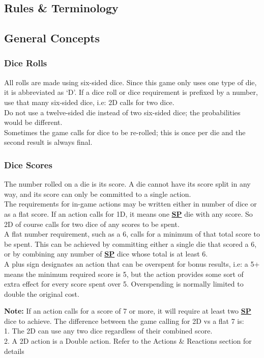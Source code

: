 \documentclass[12pt]{article}
\newcommand{\refto}[1]{\hyperlink{#1}{\textbf{#1}}}
\begin{document}
\begin{multicols*}{2}

\setlength{\parindent}{0pt}
\section{Rules \& Terminology}
\subsection{General Concepts}
\subsubsection*{Dice Rolls}
All rolls are made using six-sided dice. Since this game only uses one type of die, it is abbreviated as ‘D’. If a dice roll or dice requirement is prefixed by a number, use that many six-sided dice, i.e: 2D calls for two dice.\\
Do not use a twelve-sided die instead of two six-sided dice; the probabilities would be different.\\
Sometimes the game calls for dice to be re-rolled; this is once per die and the second result is always final.

\subsubsection*{Dice Scores}
The number rolled on a die is its score. A die cannot have its score split in any way, and its score can only be committed to a single action.\\
The requirements for in-game actions may be written either in number of dice or as a flat score. If an action calls for 1D, it means one \refto{SP} die with any score. So 2D of course calls for two dice of any scores to be spent.\\
A flat number requirement, such as a 6, calls for a minimum of that total score to be spent. This can be achieved by committing either a single die that scored a 6, or by combining any number of \refto{SP} dice whose total is at least 6.\\
A plus sign designates an action that can be overspent for bonus results, i.e: a 5+ means the minimum required score is 5, but the action provides some sort of extra effect for every score spent over 5. Overspending is normally limited to double the original cost.

\begin{tcolorbox}
\textbf{Note:} If an action calls for a score of 7 or more, it will require at least two \refto{SP} dice to achieve. The difference between the game calling for 2D vs a flat 7 is:\\
1. The 2D can use any two dice regardless of their combined score.\\
2. A 2D action is a Double action. Refer to the Actions \& Reactions section for details
\end{tcolorbox}


\end{multicols*}
\end{document}
